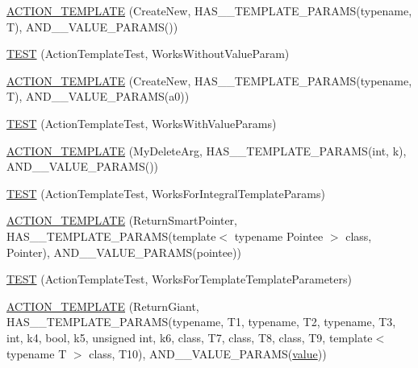 \begin{DoxyCompactItemize}
\item 
\mbox{\hyperlink{namespacetesting_1_1gmock__generated__actions__test_a1debc0726715951fcd7f5443e436dc46}{A\+C\+T\+I\+O\+N\+\_\+\+T\+E\+M\+P\+L\+A\+TE}} (Create\+New, H\+A\+S\+\_\+\_\+\+T\+E\+M\+P\+L\+A\+T\+E\+\_\+\+P\+A\+R\+A\+MS(typename, T), A\+N\+D\+\_\+\_\+\+V\+A\+L\+U\+E\+\_\+\+P\+A\+R\+A\+MS())
\item 
\mbox{\hyperlink{namespacetesting_1_1gmock__generated__actions__test_aaac879cbe00638dcc2d4733760180a4f}{T\+E\+ST}} (Action\+Template\+Test, Works\+Without\+Value\+Param)
\item 
\mbox{\hyperlink{namespacetesting_1_1gmock__generated__actions__test_a38fb8047f95126bb0b2cfe7e670c8af7}{A\+C\+T\+I\+O\+N\+\_\+\+T\+E\+M\+P\+L\+A\+TE}} (Create\+New, H\+A\+S\+\_\+\_\+\+T\+E\+M\+P\+L\+A\+T\+E\+\_\+\+P\+A\+R\+A\+MS(typename, T), A\+N\+D\+\_\+\_\+\+V\+A\+L\+U\+E\+\_\+\+P\+A\+R\+A\+MS(a0))
\item 
\mbox{\hyperlink{namespacetesting_1_1gmock__generated__actions__test_a21f6e2ad5c4c1afecca93a42c9a84f1a}{T\+E\+ST}} (Action\+Template\+Test, Works\+With\+Value\+Params)
\item 
\mbox{\hyperlink{namespacetesting_1_1gmock__generated__actions__test_aaaac0fbf0bf2c7bd8fc104310e6af25c}{A\+C\+T\+I\+O\+N\+\_\+\+T\+E\+M\+P\+L\+A\+TE}} (My\+Delete\+Arg, H\+A\+S\+\_\+\_\+\+T\+E\+M\+P\+L\+A\+T\+E\+\_\+\+P\+A\+R\+A\+MS(int, k), A\+N\+D\+\_\+\_\+\+V\+A\+L\+U\+E\+\_\+\+P\+A\+R\+A\+MS())
\item 
\mbox{\hyperlink{namespacetesting_1_1gmock__generated__actions__test_aad8d77a35ac21f366dc334a45cf5b140}{T\+E\+ST}} (Action\+Template\+Test, Works\+For\+Integral\+Template\+Params)
\item 
\mbox{\hyperlink{namespacetesting_1_1gmock__generated__actions__test_ad99d926be507eb0c031538da2e8bb838}{A\+C\+T\+I\+O\+N\+\_\+\+T\+E\+M\+P\+L\+A\+TE}} (Return\+Smart\+Pointer, H\+A\+S\+\_\+\_\+\+T\+E\+M\+P\+L\+A\+T\+E\+\_\+\+P\+A\+R\+A\+MS(template$<$ typename Pointee $>$ class, Pointer), A\+N\+D\+\_\+\_\+\+V\+A\+L\+U\+E\+\_\+\+P\+A\+R\+A\+MS(pointee))
\item 
\mbox{\hyperlink{namespacetesting_1_1gmock__generated__actions__test_a8908d6badc9054adebdaf5ed8d455c2d}{T\+E\+ST}} (Action\+Template\+Test, Works\+For\+Template\+Template\+Parameters)
\item 
\mbox{\hyperlink{namespacetesting_1_1gmock__generated__actions__test_aea61dba8f93605f3e8c1cdedfd1079f5}{A\+C\+T\+I\+O\+N\+\_\+\+T\+E\+M\+P\+L\+A\+TE}} (Return\+Giant, H\+A\+S\+\_\+\_\+\+T\+E\+M\+P\+L\+A\+T\+E\+\_\+\+P\+A\+R\+A\+MS(typename, T1, typename, T2, typename, T3, int, k4, bool, k5, unsigned int, k6, class, T7, class, T8, class, T9, template$<$ typename T $>$ class, T10), A\+N\+D\+\_\+\_\+\+V\+A\+L\+U\+E\+\_\+\+P\+A\+R\+A\+MS(\mbox{\hyperlink{_obj__test_2lib_2googletest-master_2googlemock_2test_2gmock-matchers__test_8cc_a337b8a670efc0b086ad3af163f3121b6}{value}}))

\end{DoxyCompactItemize}
